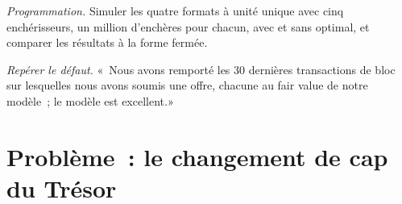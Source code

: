 \begin{exercise}[$\star\star\star$]\label{exo:qm:games-auctions-and-information:7}
\emph{Programmation.} Simuler les quatre formats à unité unique avec cinq enchérisseurs, un million d'enchères pour chacun, avec et sans  optimal, et comparer les résultats à la forme fermée.
\end{exercise}

\begin{exercise}[$\star\star\star$]\label{exo:qm:games-auctions-and-information:8}
\emph{Repérer le défaut.} «~Nous avons remporté les 30 dernières transactions de bloc sur lesquelles nous avons soumis une offre, chacune au fair value de notre modèle~; le modèle est excellent.»
\end{exercise}

\section{Problème~: le changement de cap du Trésor}

